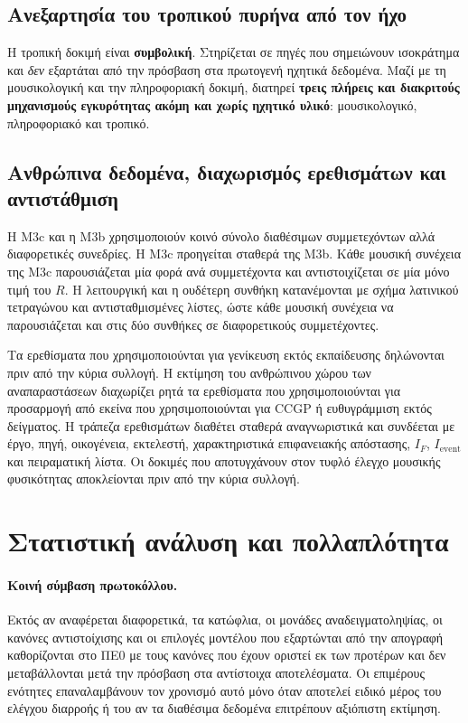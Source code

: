 \documentclass[11pt,a4paper]{article}
\begin{document}
\subsection{Ανεξαρτησία του τροπικού πυρήνα από τον ήχο}\label{app:splits-trop-audio}

Η τροπική δοκιμή είναι \textbf{συμβολική}. Στηρίζεται σε πηγές που σημειώνουν ισοκράτημα και \emph{δεν} εξαρτάται από την πρόσβαση στα πρωτογενή ηχητικά δεδομένα. Μαζί με τη μουσικολογική και την πληροφοριακή δοκιμή, διατηρεί \textbf{τρεις πλήρεις και διακριτούς μηχανισμούς εγκυρότητας ακόμη και χωρίς ηχητικό υλικό}: μουσικολογικό, πληροφοριακό και τροπικό.


\subsection{Ανθρώπινα δεδομένα, διαχωρισμός ερεθισμάτων και αντιστάθμιση}\label{app:splits-human}

Η M3c και η M3b χρησιμοποιούν κοινό σύνολο διαθέσιμων συμμετεχόντων αλλά διαφορετικές συνεδρίες. Η M3c προηγείται σταθερά της M3b. Κάθε μουσική συνέχεια της M3c παρουσιάζεται μία φορά ανά συμμετέχοντα και αντιστοιχίζεται σε μία μόνο τιμή του $R$. Η λειτουργική και η ουδέτερη συνθήκη κατανέμονται με σχήμα λατινικού τετραγώνου και αντισταθμισμένες λίστες, ώστε κάθε μουσική συνέχεια να παρουσιάζεται και στις δύο συνθήκες σε διαφορετικούς συμμετέχοντες.

Τα ερεθίσματα που χρησιμοποιούνται για γενίκευση εκτός εκπαίδευσης δηλώνονται πριν από την κύρια συλλογή. Η εκτίμηση του ανθρώπινου χώρου των αναπαραστάσεων διαχωρίζει ρητά τα ερεθίσματα που χρησιμοποιούνται για προσαρμογή από εκείνα που χρησιμοποιούνται για CCGP ή ευθυγράμμιση εκτός δείγματος. Η τράπεζα ερεθισμάτων διαθέτει σταθερά αναγνωριστικά και συνδέεται με έργο, πηγή, οικογένεια, εκτελεστή, χαρακτηριστικά επιφανειακής απόστασης, $I_F$, $I_{\mathrm{event}}$ και πειραματική λίστα. Οι δοκιμές που αποτυγχάνουν στον τυφλό έλεγχο μουσικής φυσικότητας αποκλείονται πριν από την κύρια συλλογή.

\section{Στατιστική ανάλυση και πολλαπλότητα}\label{app:stats}

\paragraph{Κοινή σύμβαση πρωτοκόλλου.} Εκτός αν αναφέρεται διαφορετικά, τα κατώφλια, οι μονάδες αναδειγματοληψίας, οι κανόνες αντιστοίχισης και οι επιλογές μοντέλου που εξαρτώνται από την απογραφή καθορίζονται στο ΠΕ0 με τους κανόνες που έχουν οριστεί εκ των προτέρων και δεν μεταβάλλονται μετά την πρόσβαση στα αντίστοιχα αποτελέσματα. Οι επιμέρους ενότητες επαναλαμβάνουν τον χρονισμό αυτό μόνο όταν αποτελεί ειδικό μέρος του ελέγχου διαρροής ή του αν τα διαθέσιμα δεδομένα επιτρέπουν αξιόπιστη εκτίμηση.
\end{document}
